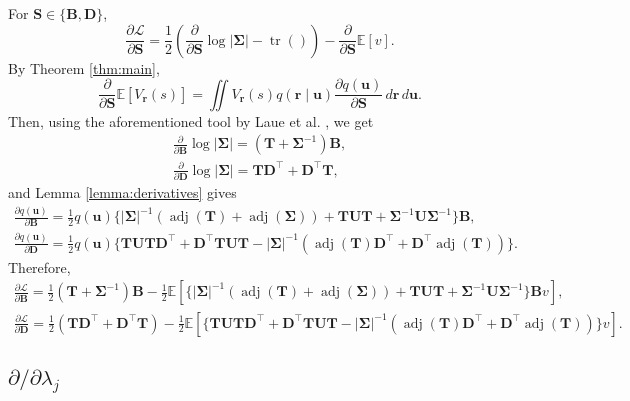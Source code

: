 \documentclass{article}
\theoremstyle{definition}
\theoremstyle{remark}
\DeclareMathOperator{\tr}{tr}
\DeclareMathOperator{\adj}{adj}
\newcommand{\V}{V_{\mathbf{r}}}
\newcommand{\dS}{\frac{\partial}{\partial\mathbf{S}}}
\newcommand{\dD}{\frac{\partial}{\partial\mathbf{D}}}
\newcommand{\dB}{\frac{\partial}{\partial\mathbf{B}}}
\newcommand{\dx}{\,d\mathbf{r}\,d\mathbf{u}}
\begin{document}
For $\mathbf{S} \in \{ \mathbf{B}, \mathbf{D} \}$,
\[
  \frac{\partial\mathcal{L}}{\partial\mathbf{S}} =
  \frac{1}{2}(\dS\log|\bm\Sigma| - \tr \left( \right)) %
  - \dS\mathbb{E}[v].
\]
By Theorem \ref{thm:main},
\[
  \dS\mathbb{E}[\V(s)] = \iint \V(s) q(\mathbf{r} \mid \mathbf{u})
  \frac{\partial q(\mathbf{u})}{\partial \mathbf{S}}\dx.
\]
Then, using the aforementioned tool by Laue et al.
\cite{DBLP:conf/nips/LaueMG18}, we get
\begin{gather*}
  \dB\log|\bm\Sigma| = (\mathbf{T} + \bm\Sigma^{-1})\mathbf{B}, \\
  \dD\log|\bm\Sigma| = \mathbf{T}\mathbf{D}^\intercal +
  \mathbf{D}^\intercal\mathbf{T},
\end{gather*}
and Lemma \ref{lemma:derivatives} gives
\begin{gather*}
  \frac{\partial q(\mathbf{u})}{\partial \mathbf{B}} = \frac{1}{2}q(\mathbf{u})
  \{ |\bm\Sigma|^{-1}(\adj(\mathbf{T}) + \adj(\bm\Sigma)) + \mathbf{TUT} +
  \bm\Sigma^{-1}\mathbf{U}\bm\Sigma^{-1} \} \mathbf{B}, \\
  \frac{\partial q(\mathbf{u})}{\partial \mathbf{D}} = \frac{1}{2}q(\mathbf{u})
  \{ \mathbf{T}\mathbf{UT}\mathbf{D}^\intercal +
  \mathbf{D}^\intercal\mathbf{T}\mathbf{UT} -
  |\bm\Sigma|^{-1}(\adj(\mathbf{T})\mathbf{D}^\intercal + \mathbf{D}^\intercal
  \adj(\mathbf{T})) \}.
\end{gather*}
Therefore,
\begin{gather*}
  \frac{\partial \mathcal{L}}{\partial \mathbf{B}} = \frac{1}{2}(\mathbf{T} +
  \bm\Sigma^{-1})\mathbf{B} - \frac{1}{2} \mathbb{E} [\{
  |\bm\Sigma|^{-1}(\adj(\mathbf{T}) + \adj(\bm\Sigma)) + \mathbf{TUT} +
  \bm\Sigma^{-1}\mathbf{U}\bm\Sigma^{-1} \} \mathbf{B}v], \\
  \frac{\partial \mathcal{L}}{\partial \mathbf{D}} =
  \frac{1}{2}(\mathbf{TD}^\intercal + \mathbf{D}^\intercal\mathbf{T}) -
  \frac{1}{2}\mathbb{E}[\{ \mathbf{T}\mathbf{UT}\mathbf{D}^\intercal +
  \mathbf{D}^\intercal\mathbf{T}\mathbf{UT} -
  |\bm\Sigma|^{-1}(\adj(\mathbf{T})\mathbf{D}^\intercal + \mathbf{D}^\intercal
  \adj(\mathbf{T})) \}v].
\end{gather*}

\subsection{$\partial/\partial \lambda_j$}
\end{document}

